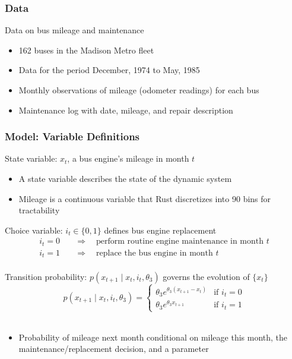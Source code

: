 \documentclass{beamer}
\begin{document}
\begin{frame}\frametitle{Data}
    Data on bus mileage and maintenance
    \begin{itemize}
    	\item 162 buses in the Madison Metro fleet
    	\item Data for the period December, 1974 to May, 1985
    	\item Monthly observations of mileage (odometer readings) for each bus
    	\item Maintenance log with date, mileage, and repair description
    \end{itemize}
\end{frame}

\begin{frame}\frametitle{Model: Variable Definitions}
    State variable: $x_t$, a bus engine's mileage in month $t$
    \begin{itemize}
    	\item A state variable describes the state of the dynamic system
    	\item Mileage is a continuous variable that Rust discretizes into 90 bins for tractability
    \end{itemize}
    \vspace{2ex}
    Choice variable: $i_t \in \{0, 1\}$ defines bus engine replacement
    \begin{align*}
    	i_t = 0 \quad &\Rightarrow \quad \text{perform routine engine maintenance in month } t \\
    	i_t = 1 \quad &\Rightarrow \quad \text{replace the bus engine in month } t
    \end{align*} \\
    \vspace{2ex}
    Transition probability: $p(x_{t+1} \mid x_t, i_t, \theta_3)$ governs the evolution of $\{x_t\}$
    $$p(x_{t+1} \mid x_t, i_t, \theta_3) = 
    	\begin{cases}
    		\theta_3 e^{\theta_3 (x_{t+1} - x_t)} & \text{if } i_t = 0\\
    		\theta_3 e^{\theta_3 x_{t+1}} & \text{if } i_t = 1
    	\end{cases}$$ \\	
    \begin{itemize}
    	\item Probability of mileage next month conditional on mileage this month, the maintenance/replacement decision, and a parameter
    \end{itemize}
\end{frame}
\end{document}
